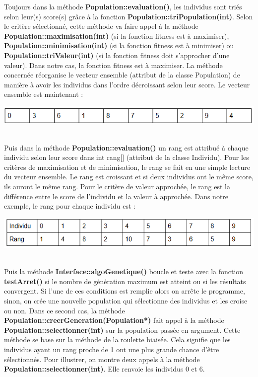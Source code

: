 \documentclass[a4paper,11pt]{article}
\begin{document}
			Toujours dans la méthode \textbf{Population::evaluation()}, les individus sont triés selon leur(s) score(s) grâce à la fonction \textbf{Population::triPopulation(int)}.
			Selon le critère sélectionné, cette méthode va faire appel à la méthode \textbf{Population::maximisation(int)} (si la fonction fitness est à maximiser), \textbf{Population::minimisation(int)} (si la fonction fitness est à minimiser) ou \textbf{Population::triValeur(int)} (si la fonction fitness doit s’approcher d’une valeur).
			Dans notre cas, la fonction fitness est à maximiser. La méthode concernée réorganise le vecteur ensemble (attribut de la classe Population) de manière à avoir les individus dans l’ordre décroissant selon leur score.
			Le vecteur ensemble est maintenant :\\
			\centerline{\includegraphics[scale=0.5]{VecteurTrie.png}}\\
			
			Puis dans la méthode \textbf{Population::evaluation()} un rang est attribué à chaque individu selon leur score dans int rang[] (attribut de la classe Individu).
			Pour les critères de maximisation et de minimisation, le rang se fait en une simple lecture du vecteur ensemble.
			Le rang est croissant et si deux individus ont le même score, ils auront le même rang.
			Pour le critère de valeur approchée, le rang est la différence entre le score de l’individu et la valeur à approchée.
			Dans notre exemple, le rang pour chaque individu est :\\
			\centerline{\includegraphics[scale=0.5]{RangIndividu.png}}\\
			
			Puis la méthode \textbf{Interface::algoGenetique()} boucle et teste avec la fonction \textbf{testArret()} si le nombre de génération maximum est atteint ou si les résultats convergent.
			Si l’une de ces conditions est remplie alors on arrête le programme, sinon, on crée une nouvelle population qui sélectionne des individus et les croise ou non.
			Dans ce second cas, la méthode \textbf{Population::creerGeneration(Population*)} fait appel à la méthode \textbf{Population::selectionner(int)} sur la population passée en argument.
			Cette méthode se base sur la méthode de la roulette biaisée.
			Cela signifie que les individus ayant un rang proche de 1 ont une plus grande chance d’être sélectionnés.
			Pour illustrer, on montre deux appels à la méthode \textbf{Population::selectionner(int)}. Elle renvoie les individus 0 et 6.\\
\end{document}
